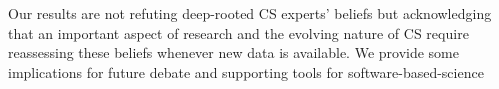 \documentclass[sigconf,review,anonymous]{acmart}
\newcommand{\bi}{\begin{itemize}}
\begin{document}
Our results are not refuting deep-rooted CS experts' beliefs but acknowledging that an important aspect of research and the evolving nature of CS require reassessing these beliefs whenever new data is available. We provide some implications for future debate and supporting tools for software-based-science 








\end{document}
